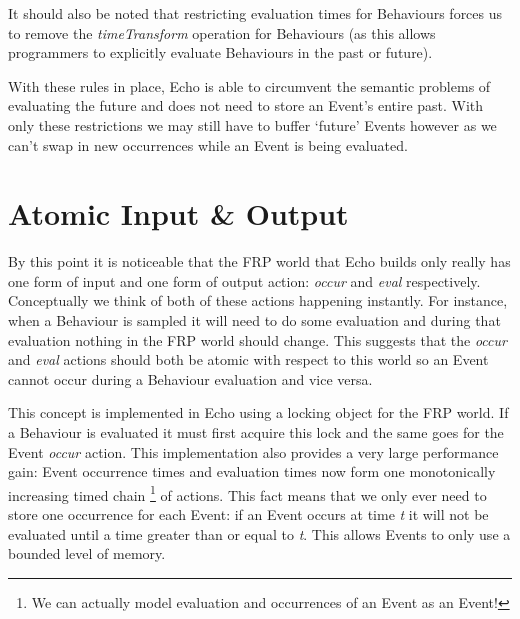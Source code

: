     It should also be noted that restricting evaluation times for Behaviours forces us
    to remove the \emph{timeTransform} operation for Behaviours (as this allows programmers to explicitly
    evaluate Behaviours in the past or future).
    
    With these rules in place, Echo is able to circumvent the semantic problems of evaluating the future
    and does not need to store an Event's entire past. With only these restrictions we may still have to
    buffer `future' Events however as we can't swap in new occurrences while an Event is being evaluated.
    
  \section{Atomic Input \& Output}

     By this point it is noticeable that the FRP world that Echo builds only really has one form of input and one
     form of output action: \emph{occur} and \emph{eval} respectively. Conceptually we think of both of these
     actions happening instantly. For instance, when a Behaviour is sampled it will need to do some evaluation
     and during that evaluation nothing in the FRP world should change. This suggests that the \emph{occur}
     and \emph{eval} actions should both be atomic with respect to this world so an Event cannot occur during
     a Behaviour evaluation and vice versa. 

     This concept is implemented in Echo using a locking object for the FRP world. If a Behaviour is evaluated it
     must first acquire this lock and the same goes for the Event \emph{occur} action. This implementation
     also provides a very large performance gain: Event occurrence times and evaluation times now form one
     monotonically increasing timed chain \footnote{We can actually model evaluation and occurrences of an Event as an 
     Event!} of actions. This fact means that we only ever need to store one occurrence for each Event: if an Event occurs
     at time \emph{t} it will not be evaluated until a time greater than or equal to \emph{t}. This allows
     Events to only use a bounded level of memory. 

